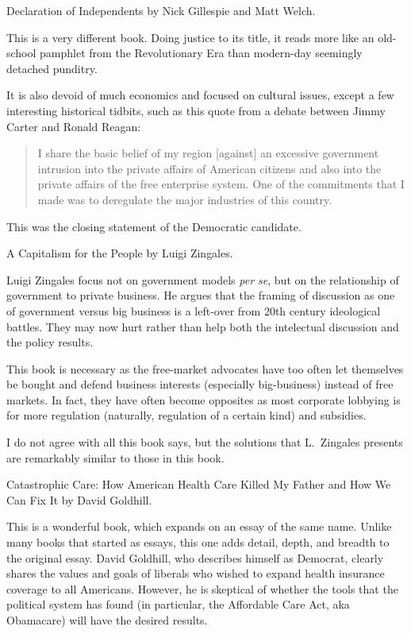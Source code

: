 \book Declaration of Independents by Nick Gillespie and Matt Welch.

This is a very different book. Doing justice to its title, it reads more like
an old-school pamphlet from the Revolutionary Era than modern-day seemingly
detached punditry.

It is also devoid of much economics and focused on cultural issues, except a
few interesting historical tidbits, such as this quote from a debate between
Jimmy Carter and Ronald Reagan:

\begin{quote}
I share the basic belief of my region [against] an excessive government
intrusion into the private affairs of American citizens and also into the
private affairs of the free enterprise system. One of the commitments that I
made was to deregulate the major industries of this country.
\end{quote}

This was the closing statement of the Democratic candidate.

\book A Capitalism for the People by Luigi Zingales.

Luigi Zingales focus not on government models \emph{per se}, but on the
relationship of government to private business. He argues that the framing of
discussion as one of government versus big business is a left-over from 20th
century ideological battles. They may now hurt rather than help both the
intelectual discussion and the policy results.

This book is necessary as the free-market advocates have too often let
themselves be bought and defend business interests (especially big-business)
instead of free markets. In fact, they have often become opposites as most
corporate lobbying is for more regulation (naturally, regulation of a certain
kind) and subsidies.

I do not agree with all this book says, but the solutions that L.\ Zingales
presents are remarkably similar to those in this book.

\book Catastrophic Care: How American Health Care Killed My Father and How We
Can Fix It by David Goldhill.

This is a wonderful book, which expands on an essay of the same name. Unlike
many books that started as essays, this one adds detail, depth, and breadth to
the original essay. David Goldhill, who describes himself as Democrat, clearly
shares the values and goals of liberals who wished to expand health insurance
coverage to all Americans. However, he is skeptical of whether the tools that
the political system has found (in particular, the Affordable Care Act, aka
Obamacare) will have the desired results.

